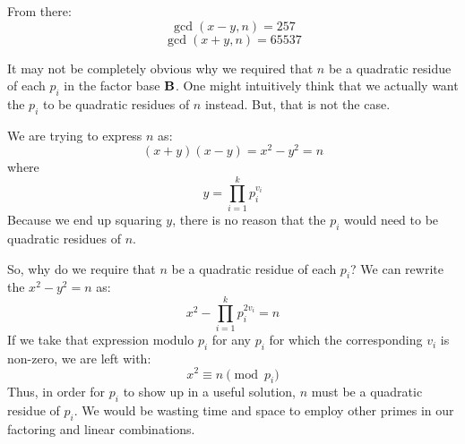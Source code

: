 \documentclass[12pt]{article}
\newcommand{\B}{\ensuremath\mathbf{B}}
\begin{document}
	From there:
$$ \gcd( x-y, n ) = 257 $$
$$ \gcd( x+y, n ) = 65537 $$

	It may not be completely obvious why we required that
	$n$ be a quadratic residue of each $p_i$ in the
	factor base $\B$.  One might
	intuitively think that we actually want the $p_i$ to
	be quadratic residues of $n$ instead.  But, that is
	not the case.

	We are trying to express $n$ as:
$$ ( x + y ) ( x - y ) = x^2 - y^2 = n $$
	where
$$ y = \prod_{i=1}^{k} p_i^{v_i} $$
	Because we end up squaring $y$, there is no reason
	that the $p_i$ would need to be quadratic residues
	of $n$.

	So, why do we require that $n$ be a quadratic residue
	of each $p_i$?  We can rewrite the $x^2 - y^2 = n$ as:
$$ x^2 - \prod_{i=1}^{k} p_i^{2v_i} = n$$
	If we take that expression modulo $p_i$ for any $p_i$
	for which the corresponding $v_i$ is non-zero, we are
	left with:
$$ x^2 \equiv n \pmod{p_i} $$
	Thus, in order for $p_i$ to show up in a useful
	solution, $n$ must be a quadratic residue of $p_i$.
	We would be wasting time and space to employ other
	primes in our factoring and linear combinations.
\end{document}
